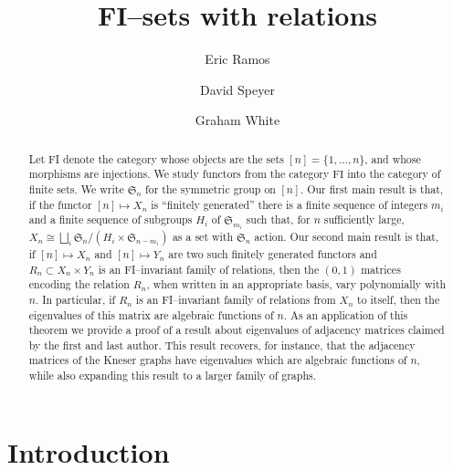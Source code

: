 \documentclass[10pt]{amsart}
\author{Eric Ramos}
\author{David Speyer}
\author{Graham White}
\title{FI--sets with relations}
\theoremstyle{definition}
\begin{document}
\begin{abstract}
Let FI denote the category whose objects are the sets $[n] = \{1,\ldots, n\}$, and whose morphisms are injections. 
We study functors from the category $\mathrm{FI}$ into the category of finite sets. We write $\mathfrak{S}_n$ for the symmetric group on $[n]$.
Our first main result is that, if the functor $[n] \mapsto X_n$ is ``finitely generated'' there is a finite sequence of integers $m_i$ and a finite sequence of subgroups $H_i$ of $\mathfrak{S}_{m_i}$ such that, for $n$ sufficiently large, $X_n \cong \bigsqcup_i \mathfrak{S}_n/(H_i \times \mathfrak{S}_{n-m_i})$ as a set with $\mathfrak{S}_n$ action. Our second main result is that, if $[n] \mapsto X_n$ and $[n] \mapsto Y_n$ are two such finitely generated functors and $R_n \subset X_n \times Y_n$ is an FI--invariant family of relations, then the $(0,1)$ matrices encoding the relation $R_n$, when written in an appropriate basis, vary polynomially with $n$. In particular, if $R_n$ is an FI--invariant family of relations from $X_n$ to itself, then the eigenvalues of this matrix are algebraic functions of $n$. As an application of this theorem we provide a proof of a result about eigenvalues of adjacency matrices claimed by the first and last author. This result recovers, for instance, that the adjacency matrices of the Kneser graphs have eigenvalues which are algebraic functions of $n$, while also expanding this result to a larger family of graphs.
\end{abstract}





\maketitle

\section{Introduction}
\end{document}
